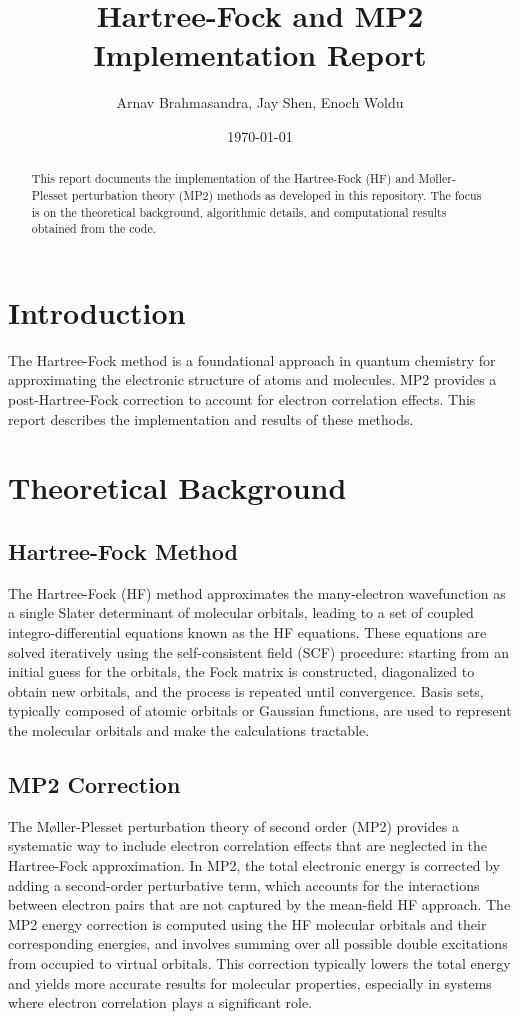 \documentclass[12pt]{article}
\title{Hartree-Fock and MP2 Implementation Report}
\author{Arnav Brahmasandra, Jay Shen, Enoch Woldu}
\date{\today}
\begin{document}
\maketitle

\begin{abstract}
This report documents the implementation of the Hartree-Fock (HF) and Møller-Plesset perturbation theory (MP2) methods as developed in this repository. The focus is on the theoretical background, algorithmic details, and computational results obtained from the code.
\end{abstract}

\section{Introduction}
The Hartree-Fock method is a foundational approach in quantum chemistry for approximating the electronic structure of atoms and molecules. MP2 provides a post-Hartree-Fock correction to account for electron correlation effects. This report describes the implementation and results of these methods.

\section{Theoretical Background}
\subsection{Hartree-Fock Method}
The Hartree-Fock (HF) method approximates the many-electron wavefunction as a single Slater determinant of molecular orbitals, leading to a set of coupled integro-differential equations known as the HF equations. These equations are solved iteratively using the self-consistent field (SCF) procedure: starting from an initial guess for the orbitals, the Fock matrix is constructed, diagonalized to obtain new orbitals, and the process is repeated until convergence. Basis sets, typically composed of atomic orbitals or Gaussian functions, are used to represent the molecular orbitals and make the calculations tractable.

\subsection{MP2 Correction}
The Møller-Plesset perturbation theory of second order (MP2) provides a systematic way to include electron correlation effects that are neglected in the Hartree-Fock approximation. In MP2, the total electronic energy is corrected by adding a second-order perturbative term, which accounts for the interactions between electron pairs that are not captured by the mean-field HF approach. The MP2 energy correction is computed using the HF molecular orbitals and their corresponding energies, and involves summing over all possible double excitations from occupied to virtual orbitals. This correction typically lowers the total energy and yields more accurate results for molecular properties, especially in systems where electron correlation plays a significant role.
\end{document}
